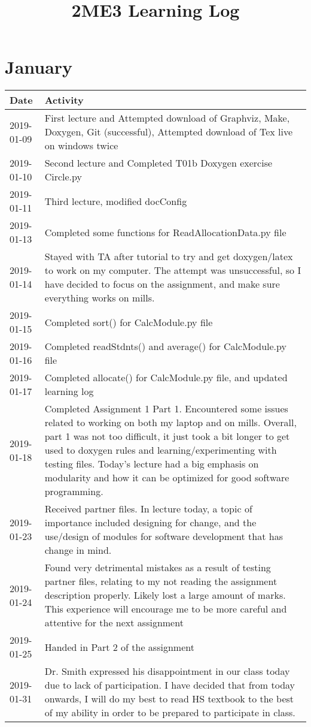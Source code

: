 \documentclass[12pt]{article}
\begin{document}
\title{2ME3 Learning Log}
\maketitle

\section{January}


 \begin{tabular}{|p{2cm}| p{12cm}|} 
 \hline
 Date & Activity   \\  
 \hline
 2019-01-09 & First lecture and Attempted download of Graphviz, Make, Doxygen, Git (successful), Attempted download of Tex live on windows twice \\
 \hline
 2019-01-10 & Second lecture and Completed T01b Doxygen exercise Circle.py\\
 \hline
 2019-01-11 & Third lecture, modified docConfig\\
 \hline
 2019-01-13 &Completed some functions for ReadAllocationData.py file \\
 \hline
 2019-01-14 &Stayed with TA after tutorial to try and get doxygen/latex to work on my computer. The attempt was unsuccessful, so I have decided to focus on the assignment, and make sure everything works on mills. \\
 \hline
 2019-01-15 &Completed sort() for CalcModule.py file \\
 \hline
 2019-01-16 &Completed readStdnts() and average() for CalcModule.py file \\
 \hline
 2019-01-17 &Completed allocate() for CalcModule.py file, and updated learning log \\
 \hline
 2019-01-18 &Completed Assignment 1 Part 1. Encountered some issues related to working on both my laptop and on mills. Overall, part 1 was not too difficult, it just took a bit longer to get used to doxygen rules and learning/experimenting with testing files. Today's lecture had a big emphasis on modularity and how it can be optimized for good software programming.\\
 \hline
  2019-01-23 &Received partner files. In lecture today, a topic of importance included designing for change, and the use/design of modules for software development that has change in mind. \\
 \hline
   2019-01-24 & Found very detrimental mistakes as a result of testing partner files, relating to my not reading the assignment description properly. Likely lost a large amount of marks. This experience will encourage me to be more careful and attentive for the next assignment  \\
 \hline
   2019-01-25 & Handed in Part 2 of the assignment \\
 \hline
   2019-01-31 & Dr. Smith expressed his disappointment in our class today due to lack of participation. I have decided that from today onwards, I will do my best to read HS textbook to the best of my ability in order to be prepared to participate in class. \\
 \hline

 
\end{tabular}
\end{document}
